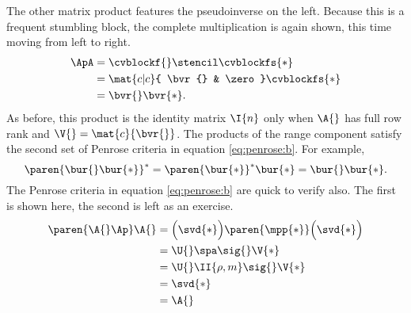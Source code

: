 The other matrix product features the pseudoinverse on the left. Because this is a frequent  stumbling block, the complete multiplication is again shown, this time moving from left to right.
%
\begin{equation}
  \begin{split}
    \ApA 
      &= \cvblockf{} \stencil \cvblockfs{*} \\
      &= \mat{c|c}{ \bvr{} & \zero } \cvblockfs{*} \\
      &= \bvr{} \bvr{*}.
  \label{eq:penrose:apa}
  \end{split}
\end{equation}
%
As before, this product is the identity matrix $\I{n}$ only when $\A{}$ has full row rank and $\V{}=\mat{c}{\bvr{}}$.
%
The products of the range component satisfy the second set of Penrose criteria in equation \eqref{eq:penrose:b}. For example,
\begin{equation}
  \paren{\bur{} \bur{*}}^{*} = \paren{\bur{*}}^{*} \bur{*} = \bur{} \bur{*}.
\end{equation}
The Penrose criteria in equation \eqref{eq:penrose:b} are quick to verify also. The first is shown here, the second is left as an exercise.
\begin{equation}
  \begin{split}
    \paren{\A{} \Ap} \A{} 
      &= \Bigl(\svd{*}\Bigr) \paren{\mpp{*}} \Bigl(\svd{*}\Bigr) \\
      &= \U{} \spa \sig{} \V{*} \\
      &= \U{} \II{\rho,m} \sig{} \V{*} \\
      &= \svd{*} \\
      &= \A{} \quad 
  \end{split}
\end{equation}






\endinput